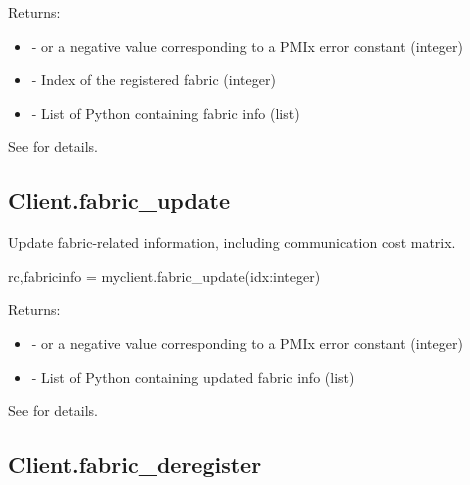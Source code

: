 Returns:

\begin{itemize}
    \item {} -  or a negative value corresponding to a PMIx error constant (integer)
    \item {} - Index of the registered fabric (integer)
    \item {} - List of Python  containing fabric info (list)
\end{itemize}

See  for details.


\subsection{Client.fabric_update}

\summary
Update fabric-related information, including communication cost matrix.

\format

\pyspecificstart
\begin{codepar}
rc,fabricinfo = myclient.fabric_update(idx:integer)
\end{codepar}
\pyspecificend


\begin{arglist}
\end{arglist}

Returns:

\begin{itemize}
    \item {} -  or a negative value corresponding to a PMIx error constant (integer)
    \item {} - List of Python  containing updated fabric info (list)
\end{itemize}

See  for details.


\subsection{Client.fabric_deregister}

